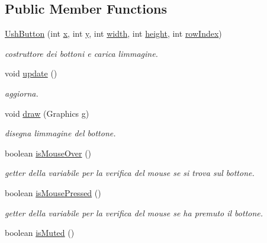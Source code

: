 \subsection*{Public Member Functions}
\begin{DoxyCompactItemize}
\item 
\hyperlink{classui_1_1_ush_button_a897b1e73322d3db9ffb350034fbff99e}{Ush\+Button} (int \hyperlink{classui_1_1_pause_button_a6150e0515f7202e2fb518f7206ed97dc}{x}, int \hyperlink{classui_1_1_pause_button_a0a2f84ed7838f07779ae24c5a9086d33}{y}, int \hyperlink{classui_1_1_pause_button_a2474a5474cbff19523a51eb1de01cda4}{width}, int \hyperlink{classui_1_1_pause_button_ad12fc34ce789bce6c8a05d8a17138534}{height}, int \hyperlink{classui_1_1_ush_button_aa472bc4708470ef0afc61d3c18896ec9}{row\+Index})
\begin{DoxyCompactList}\small\item\em costruttore dei bottoni e carica l\textquotesingle{}immagine. \end{DoxyCompactList}\item 
void \hyperlink{classui_1_1_ush_button_ac5c54df7ed3b930268c8d7752c101725}{update} ()
\begin{DoxyCompactList}\small\item\em aggiorna. \end{DoxyCompactList}\item 
void \hyperlink{classui_1_1_ush_button_a72fe1ffca978e99fd16994a10e7f8051}{draw} (Graphics g)
\begin{DoxyCompactList}\small\item\em disegna l\textquotesingle{}immagine del bottone. \end{DoxyCompactList}\item 
boolean \hyperlink{classui_1_1_ush_button_a2deebd864f1c01a6d81238349c929885}{is\+Mouse\+Over} ()
\begin{DoxyCompactList}\small\item\em getter della variabile per la verifica del mouse se si trova sul bottone. \end{DoxyCompactList}\item 
boolean \hyperlink{classui_1_1_ush_button_ad47389f2ab3067af3626db75a6b3b09e}{is\+Mouse\+Pressed} ()
\begin{DoxyCompactList}\small\item\em getter della variabile per la verifica del mouse se ha premuto il bottone. \end{DoxyCompactList}\item 
boolean \hyperlink{classui_1_1_ush_button_ab67171d139f4fbb66413cb6c42e83945}{is\+Muted} ()

\end{DoxyCompactItemize}
